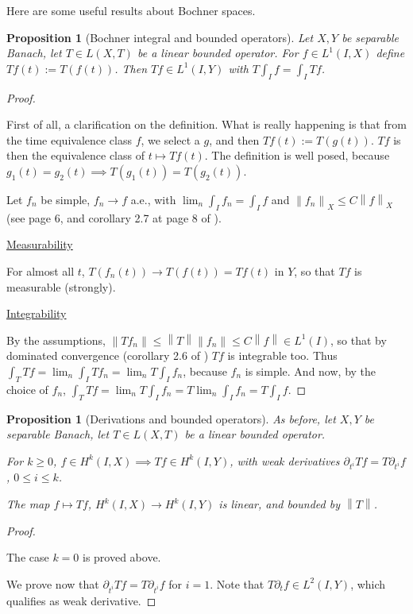 \documentclass[english,a4paper,9pt,oneside]{scrbook}	%
\theoremstyle{break}
\newtheorem{prop}[equation]{Proposition}
\newenvironment{mproof}[1][\proofname]{%
  \begin{proof}[#1]$ $\par\nobreak\ignorespaces
}{%
  \end{proof}
}
\renewcommand*{\proofname}{Proof}
\theoremstyle{remark}
\newcommand{\norm}[1]{\left\lVert#1\right\rVert}
\begin{document}
\begin{appendices}
Here are some useful results about Bochner spaces.

\begin{prop}[Bochner integral and bounded operators]
\label{prop:bochner_bound}
Let $X,Y$ be separable Banach, let $T \in L(X,T)$ be a linear bounded operator. For $f \in L^1(I,X)$ define $Tf (t):= T(f(t))$. Then $Tf \in L^1(I,Y)$ with $T\int_I f = \int_I Tf$.
\end{prop}
\begin{mproof}

First of all, a clarification on the definition. What is really happening is that from the time equivalence class $f$, we select a $g$, and then $Tf(t):=T(g(t))$. $Tf$ is then the equivalence class of $t\mapsto Tf(t)$. The definition is well posed, because $g_1(t)=g_2(t)\implies T(g_1(t))=T(g_2(t))$.

Let $f_n$ be simple, $f_n\rightarrow f $ a.e., with $\lim_n \int_I f_n = \int_I f$ and $\norm{f_n}_X \leq C \norm{f}_X$ (see page 6, and corollary 2.7 at page 8 of \cite{kreuter}).

\underline{Measurability}

For almost all $t$, $T(f_n(t)) \rightarrow T(f(t))=Tf(t)$ in $Y$, so that $Tf$ is measurable (strongly).

\underline{Integrability}

By the assumptions, $\norm{Tf_n}\leq \norm{T}\norm{f_n}\leq C\norm{f}\in L^1(I)$, so that by dominated convergence (corollary 2.6 of \cite{kreuter}) $Tf$ is integrable too. Thus $\int_T Tf = \lim_n \int_I  Tf_n = \lim_n T\int_I  f_n$, because $f_n$ is simple. And now, by the choice of $f_n$, $\int_T Tf = \lim_n T\int_I  f_n = T \lim_n \int_I  f_n = T \int_I f$.

\end{mproof}

\begin{prop}	[Derivations and bounded operators]
\label{lemma:bochner_Hk_map}
As before, let $X,Y$ be separable Banach, let $T \in L(X,T)$ be a linear bounded operator.

For $k\geq 0$, $f \in H^k(I,X)\implies Tf \in H^k(I,Y)$, with weak derivatives $\partial_{t^i}Tf = T\partial_{t^i}f$, $0\leq i \leq k$.

The map $f \mapsto Tf$, $H^k(I,X)\rightarrow H^k(I,Y)$ is linear, and bounded by $\norm{T}$.
\end{prop}
\begin{mproof}
The case $k=0$ is proved above.

We prove now that $\partial_{t^i}Tf = T\partial_{t^i}f$ for $i=1$. Note that $T\partial_t f \in L^2(I,Y)$, which qualifies as weak derivative.


\end{mproof}
\end{appendices}
\end{document}
